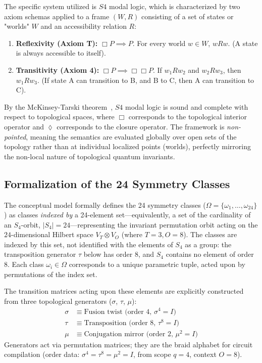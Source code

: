 The specific system utilized is $S4$ modal logic, which is characterized by two axiom schemas applied to a frame $(W, R)$ consisting of a set of states or "worlds" $W$ and an accessibility relation $R$:
\begin{enumerate}
    \item \textbf{Reflexivity (Axiom T):} $\Box P \implies P$. For every world $w \in W$, $wRw$. (A state is always accessible to itself).
    \item \textbf{Transitivity (Axiom 4):} $\Box P \implies \Box\Box P$. If $w_1Rw_2$ and $w_2Rw_3$, then $w_1Rw_3$. (If state A can transition to B, and B to C, then A can transition to C).
\end{enumerate}
By the McKinsey-Tarski theorem~\cite{mckinsey1944}, $S4$ modal logic is sound and complete with respect to topological spaces, where $\Box$ corresponds to the topological interior operator and $\lozenge$ corresponds to the closure operator. The framework is \textit{non-pointed}, meaning the semantics are evaluated globally over open sets of the topology rather than at individual localized points (worlds), perfectly mirroring the non-local nature of topological quantum invariants.

\subsection{Formalization of the 24 Symmetry Classes}
The conceptual model formally defines the 24 symmetry classes ($\Omega = \{\omega_1, \dots, \omega_{24}\}$) as classes \textit{indexed by} a 24-element set---equivalently, a set of the cardinality of an $S_4$-orbit, $|S_4| = 24$---representing the invariant permutation orbit acting on the $24$-dimensional Hilbert space $V_T \otimes V_O$ (where $T=3, O=8$). The classes are indexed by this set, not identified with the elements of $S_4$ as a group: the transposition generator $\tau$ below has order 8, and $S_4$ contains no element of order 8. Each class $\omega_i \in \Omega$ corresponds to a unique parametric tuple, acted upon by permutations of the index set.

The transition matrices acting upon these elements are explicitly constructed from three topological generators ($\sigma$, $\tau$, $\mu$):
\begin{align}
    \sigma &\equiv \text{Fusion twist (order 4, $\sigma^4 = I$)} \\
    \tau &\equiv \text{Transposition (order 8, $\tau^8 = I$)} \\
    \mu &\equiv \text{Conjugation mirror (order 2, $\mu^2 = I$)}
\end{align}
Generators act via permutation matrices; they are the braid alphabet for circuit compilation (order data: $\sigma^4 = \tau^8 = \mu^2 = I$, from scope $q = 4$, context $O = 8$).

